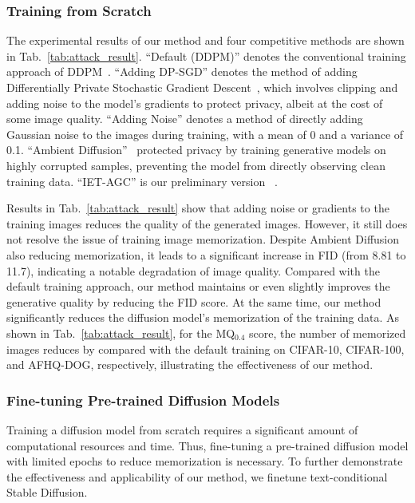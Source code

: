 \subsubsection{Training from Scratch}
The experimental results of our method and four competitive methods are shown in Tab.~\ref{tab:attack_result}.
``Default (DDPM)'' denotes the conventional training approach of DDPM~\cite{ho2020denoising}. 
``Adding DP-SGD'' denotes the method of adding Differentially Private Stochastic Gradient Descent~\cite{abadi2016deep}, which involves clipping and adding noise to the model's gradients to protect privacy, albeit at the cost of some image quality.
``Adding Noise'' denotes a method of directly adding Gaussian noise to the images during training, with a mean of 0 and a variance of 0.1.
``Ambient Diffusion''~\cite{daras2024ambient} protected privacy by training generative models on highly corrupted samples, preventing the model from directly observing clean training data. ``IET-AGC'' is our preliminary version ~\cite{liu2024iterative}.

Results in Tab.~\ref{tab:attack_result} show that adding noise or gradients to the training images reduces the quality of the generated images. 
However, it still does not resolve the issue of training image memorization.
Despite Ambient Diffusion also reducing memorization, it leads to a significant increase in FID (from 8.81 to 11.7), indicating a notable degradation of image quality.
Compared with the default training approach, our method maintains or even slightly improves the generative quality by reducing the FID score.
At the same time, our method significantly reduces the diffusion model's memorization of the training data. As shown in Tab.~\ref{tab:attack_result}, for the MQ$_{0.4}$ score, the number of memorized images reduces by  compared with the default training on CIFAR-10, CIFAR-100, and AFHQ-DOG, respectively, illustrating the effectiveness of our method.

\subsubsection{Fine-tuning Pre-trained Diffusion Models}
\label{sec:finetune}
Training a diffusion model from scratch requires a significant amount of computational resources and time. Thus, fine-tuning a pre-trained diffusion model with limited epochs to reduce memorization is necessary.
To further demonstrate the effectiveness and applicability of our method, we finetune text-conditional Stable Diffusion.

